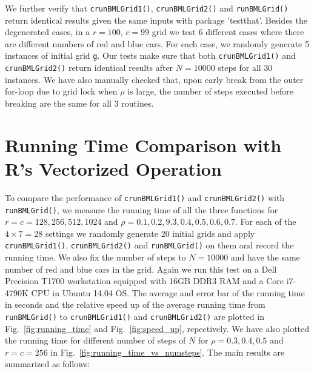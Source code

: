\documentclass{article}
\begin{document}
We further verify that \texttt{crunBMLGrid1()}, \texttt{crunBMLGrid2()} and
\texttt{runBMLGrid()} return identical results given the same inputs with
package 'testthat'. Besides the degenerated cases, in a $r=100$, $c=99$
grid we test 6 different cases where there are different numbers of red and blue
cars. For each case, we randomly generate 5 instances of initial grid
\texttt{g}. Our tests make sure that both \texttt{crunBMLGrid1()} and
\texttt{crunBMLGrid2()} return identical results after $N = 10000$ steps for all
30 instances. We have also manually checked that, upon early break from the
outer for-loop due to grid lock when $\rho$ is large, the number of steps executed
before breaking are the same for all 3 routines.

\section{Running Time Comparison with R's Vectorized Operation}
To compare the performance of \texttt{crunBMLGrid1()} and
\texttt{crunBMLGrid2()} with \texttt{runBMLGrid()}, we measure the running time
of all the three functions for $r=c=128,256,512,1024$ and
$\rho=0.1,0.2,9.3,0.4,0.5,0.6,0.7$. For each of the $4\times7=28$ settings we
randomly generate 20 initial grids and apply \texttt{crunBMLGrid1()},
\texttt{crunBMLGrid2()} and \texttt{runBMLGrid()} on them and record the running
time. We also fix the number of steps to $N=10000$ and have the same number of
red and blue cars in the grid. Again we run this test on a Dell Precision T1700
workstation equipped with 16GB DDR3 RAM and a Core i7-4790K CPU in Ubuntu 14.04
OS. The average and error bar of the running time in seconds and the relative
speed up of the average running time from \texttt{runBMLGrid()} to
\texttt{crunBMLGrid1()} and \texttt{crunBMLGrid2()} are plotted in
Fig.~\ref{fig:running_time} and Fig.~\ref{fig:speed_up}, repectively.
We have also plotted the running time for different number of steps of $N$ for
$\rho=0.3, 0.4, 0.5$ and $r=c=256$ in Fig.~\ref{fig:running_time_vs_numsteps}.
The main results are summarized as follows:
\end{document}
